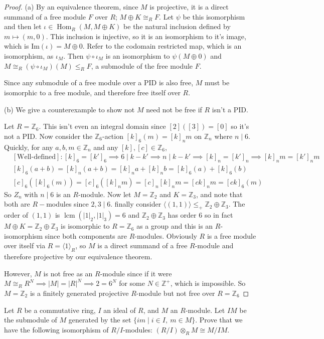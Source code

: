\documentclass[addpoints,10pt]{exam}
\theoremstyle{plain}
\theoremstyle{definition}
\newtheorem{prob}[thm]{Problem}
\theoremstyle{plain}
\theoremstyle{plain}
\theoremstyle{definition}
\let\oldprob\prob
\let\endoldprob\endprob
\renewenvironment{prob}
  {\begin{singlespace}\oldprob}
  {\endoldprob\end{singlespace}}
\newcommand{\ZZ}{\ensuremath{\mathbb{Z}}}
\DeclareMathOperator{\lcm}{lcm}
\newcommand{\Hom}{\ensuremath{\operatorname{Hom}}}
\begin{document}
\begin{proof}
(a) By an equivalence theorem, since $M$ is projective, it is a direct summand of a free module $F$ over $R$; $M\oplus K\cong_{R} F$. Let $\psi$ be this isomorphism and then let $\iota\in \Hom_{R}(M,M\oplus K)$ be the natural inclusion defined by $m\mapsto (m,0)$. This inclusion is injective, so it is an isomorphism to it's image, which is $\mathrm{Im}(\iota)=M\oplus 0$. Refer to the codomain restricted map, which is an isomorphism, as $\iota_{M}$. Then $\psi\circ \iota_{M}$ is an isomorphism to $\psi(M\oplus 0)$ and $M\cong_{R}(\psi\circ \iota_{M})(M)\leq_{R} F$, a submodule of the free module $F$.

Since any submodule of a free module over a PID is also free, $M$ must be isomorphic to a free module, and therefore free itself over $R$.

(b) We give a counterexample to show not $M$ need not be free if $R$ isn't a PID. 

Let $R=\ZZ_{6}$. This isn't even an integral domain since $[2]([3])=[0]$ so 
it's not a PID. Now consider the $\ZZ_{6}$-action $[k]_{6}(m)=[k]_{n}m$ on $\ZZ_{n}$ where $n\mid 6$. Quickly, for any $a,b,m\in \ZZ_{n}$ and any $[k],[c]\in \ZZ_{6}$,
\begin{align*}
&[\text{Well-defined}]: [k]_{6}=[k']_{6}\implies 6\mid k-k'\implies n\mid k-k'\implies [k]_{n}=[k']_{n}\implies [k]_{n}m=[k']_{n}m\\
&[k]_{6}(a+b)=[k]_{n}(a+b)=[k]_{n}a+[k]_{n}b=[k]_{6}(a)+[k]_{6}(b)\\
&[c]_{6}([k]_{6}(m))=[c]_{6}([k]_{n}m)=[c]_{n}[k]_{n}m=[ck]_{n}m=[ck]_{6}(m)
\end{align*}
So $Z_{n}$ with $n\mid 6$ is an $R$-module. Now let $M=\ZZ_{2}$ and $K=\ZZ_{3}$, and note that both are $R-$modules since $2,3\mid 6$. finally consider $\langle (1,1)\rangle\leq_{+}\ZZ_{2}\oplus \ZZ_{3}.$ The order of $(1,1)$ is $\lcm(|1|_{2},|1|_{3})=6$ and $\ZZ_{2}\oplus \ZZ_{3}$ has order $6$ so in fact $M\oplus K=\ZZ_{2}\oplus \ZZ_{3}$ is isomorphic to $R=\ZZ_{6}$ as a group and this is an $R$-isomorphism since both components are $R$-modules. Obviously $R$ is a free module over itself via $R=\langle 1 \rangle_{R}$, so $M$ is a direct summand of a free $R$-module and therefore projective by our equivalence theorem.

However, $M$ is not free as an $R$-module since if it were $M\cong_{R} R^{N}\implies |M|=|R|^{N}\implies 2=6^{N}$ for some $N\in \ZZ^{+}$, which is impossible. So $M=\ZZ_{2}$ is a finitely generated projective $R$-module but not free over $R=\ZZ_{6}$
\end{proof}
\newpage
\begin{prob}
Let $R$ be a commutative ring, $I$ an ideal of $R$, and $M$ an $R$-module. Let $IM$ be the submodule of $M$ generated by the set
$
\{im \mid i\in I,\ m\in M\}.
$
Prove that we have the following isomorphism of $R/I$-modules:
$
(R/I)\otimes_R M \cong M/IM.
$
\end{prob}
\end{document}
